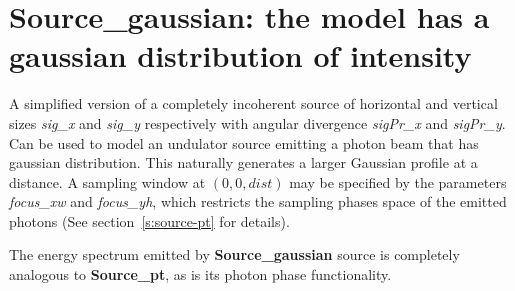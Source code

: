 \section{Source\_gaussian: the model has a gaussian distribution of intensity}
\label{source-gaussian}

A simplified version of a completely incoherent source of horizontal and
vertical sizes \textit{sig\_x} and \textit{sig\_y} respectively with angular divergence
\textit{sigPr\_x} and \textit{sigPr\_y}. Can be used to model an undulator source emitting
a photon beam that has gaussian distribution.
This naturally generates a larger Gaussian profile at a distance. A sampling window at $(0,0,\mathit{dist})$
may be specified by the parameters \textit{focus\_xw} and \textit{focus\_yh}, which restricts the
sampling phases space of the emitted photons (See section~\ref{s:source-pt} for details).

The energy spectrum emitted by \textbf{Source\_gaussian} source is completely analogous to \textbf{Source\_pt}, as is 
its photon phase functionality.
